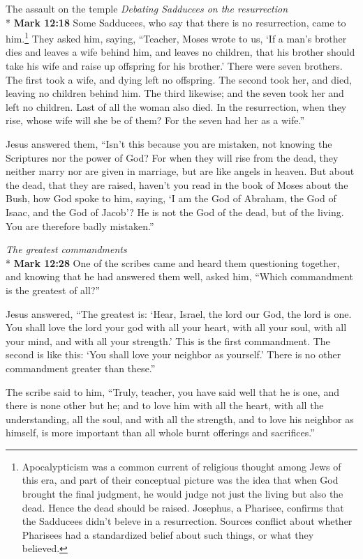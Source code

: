 \documentclass[10pt,twoside]{article} %
\newcommand{\quotesize}{\normalsize{}}
\newenvironment{quotetext}{\begingroup\quotesize}{\endgroup}
\newcommand{\intex}[1]{\index[texts]{#1}}
\newcommand{\bible}[2]{\begin{quotetext}\textbf{#1}\intex{#1} #2\end{quotetext}}
\newcommand{\gospelmark}[2]{\bible{Mark #1}{#2}}
\newcommand{\subhead}[1]{\emph{#1}\\*}
\begin{document}
\begin{section}{The assault on the temple}
\subhead{Debating Sadducees on the resurrection}
\gospelmark{12:18}{
Some Sadducees, who say that there is no resurrection, came to him.\footnote{Apocalypticism was a common
current of religious thought among Jews of this era, and part of their conceptual picture was the idea that
when God brought the final judgment, he would judge not just the living but also the dead. Hence the dead
should be raised. Josephus, a Pharisee, confirms that the Sadducees didn't beleve in a resurrection. Sources conflict about
whether Pharisees had a standardized belief about such things, or what they believed.} They asked him, saying,   ``Teacher, Moses wrote to us, `If a man's brother dies and leaves a wife behind him, and leaves no children, that his brother should take his wife and raise up offspring for his brother.'   There were seven brothers. The first took a wife, and dying left no offspring.   The second took her, and died, leaving no children behind him. The third likewise;   and the seven took her and left no children. Last of all the woman also died.   In the resurrection, when they rise, whose wife will she be of them? For the seven had her as a wife.''

  Jesus answered them, ``Isn't this because you are mistaken, not knowing the Scriptures nor the power of God?    For when they will rise from the dead, they neither marry nor are given in marriage, but are like angels in heaven.    But about the dead, that they are raised, haven't you read in the book of Moses about the Bush, how God spoke to him, saying, `I am the God of Abraham, the God of Isaac, and the God of Jacob'?    He is not the God of the dead, but of the living. You are therefore badly mistaken.'' 
}

\subhead{The greatest commandments}\label{greatest-commandments}
\gospelmark{12:28}{
One of the scribes came and heard them questioning together, and knowing that he had answered them well, asked him, ``Which commandment is the greatest of all?''

  Jesus answered, ``The greatest is: `Hear, Israel, the lord our God, the lord is one.    You shall love the lord your god with all your heart, with all your soul, with all your mind, and with all your strength.' This is the first commandment.    The second is like this: `You shall love your neighbor as yourself.' There is no other commandment greater than these.''

  The scribe said to him, ``Truly, teacher, you have said well that he is one, and there is none other but he;   and to love him with all the heart, with all the understanding, all the soul, and with all the strength, and to love his neighbor as himself, is more important than all whole burnt offerings and sacrifices.''

}
\end{section}
\end{document}
